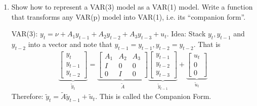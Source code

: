 \documentclass[a4paper]{scrartcl}
\begin{document}
\begin{enumerate}
\begin{solution}
\end{solution}
\item Show how to represent a VAR(3) model as a VAR(1) model. Write a function that transforms any VAR(p) model into VAR(1), i.e. its \enquote{companion form}.
\begin{solution}
	VAR(3): $y_t = \nu + A_1 y_{t-1} + A_2 y_{t-2} + A_3 y_{t-3} + u_t$. Idea: Stack $y_t, y_{t-1}$ and $y_{t-2}$ into a vector and note that $y_{t-1}=y_{t-1},y_{t-2}=y_{t-2}$. That is
\begin{align*}
\underbrace{\begin{bmatrix} y_t\\ y_{t-1} \\ y_{t-2} \end{bmatrix}}_{\widetilde{y}_t} = \underbrace{\begin{bmatrix} A_1 & A_2 & A_3 \\ I & 0 & 0\\ 0&I&0\end{bmatrix}}_{\widetilde{A}} \underbrace{\begin{bmatrix} y_{t-1}\\ y_{t-2} \\ y_{t-3} \end{bmatrix}}_{\widetilde{y}_{t-1}} + \underbrace{\begin{bmatrix} u_t \\ 0 \\ 0\end{bmatrix}}_{\widetilde{u}_t}
\end{align*}
Therefore: $\widetilde{y}_t = \widetilde{A} \widetilde{y}_{t-1} + \widetilde{u}_t$. This is called the Companion Form.

	
\end{solution}
\end{enumerate}
\newpage
\end{document}

